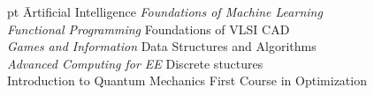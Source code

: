 \documentclass[a4paper,11pt]{article}
\newcommand{\isep}{-2 pt}
\begin{document}

\begin{tabbing}\itemsep \isep
        \hspace{1cm}\= Artificial Intelligence \hspace{3cm} \quad\= \emph{Foundations of Machine Learning} \\
                \> \emph{Functional Programming}  \>Foundations of VLSI CAD \\
                \> \emph{Games and Information}  \> Data Structures and Algorithms \\
                \>  \emph{Advanced Computing for EE} \>Discrete stuctures \\
                \>Introduction to Quantum Mechanics \> First Course in Optimization
 \end{tabbing}
\end{document}
